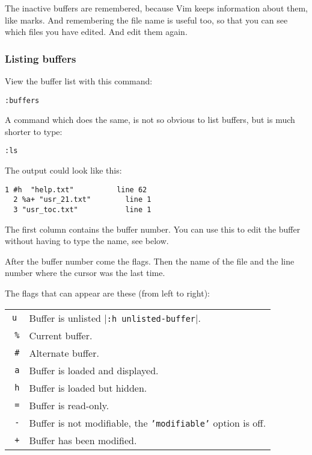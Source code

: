 The inactive buffers are remembered, because Vim keeps information about them, like marks.
And remembering the file name is useful too, so that you can see which files you have edited.
And edit them again.

\subsubsection{Listing buffers}
View the buffer list with this command:

\begin{Verbatim}[samepage=true]
 :buffers
\end{Verbatim}

A command which does the same, is not so obvious to list buffers, but is much shorter to type:

\begin{Verbatim}[samepage=true]
 :ls
\end{Verbatim}

The output could look like this:

\begin{Verbatim}[samepage=true]
  1 #h  "help.txt"          line 62 
  2 %a+ "usr_21.txt"        line 1 
  3 "usr_toc.txt"           line 1 
\end{Verbatim}

The first column contains the buffer number.
You can use this to edit the buffer without having to type the name, see below.

After the buffer number come the flags.
Then the name of the file and the line number where the cursor was the last time.
 
The flags that can appear are these (from left to right):
\begin{center} \begin{tabular}{c l}
				\texttt{u} &  Buffer is unlisted |\texttt{:h unlisted-buffer}|. \\
				\texttt{  \%} &  Current buffer. \\
				\texttt{  \#} &  Alternate buffer. \\
				\texttt{    a} & Buffer is loaded and displayed. \\
				\texttt{    h} & Buffer is loaded but hidden. \\
				\texttt{      =} & Buffer is read-only. \\
				\texttt{      -} & Buffer is not modifiable, the \texttt{'modifiable'} option is off. \\
				\texttt{        +} & Buffer has been modified. \\
\end{tabular} \end{center}
